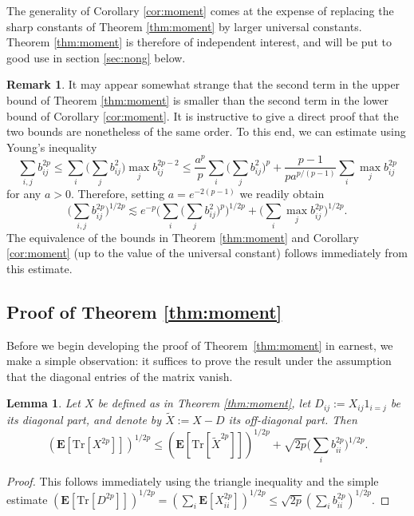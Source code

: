 \documentclass[10pt,reqno]{amsart}
\newtheorem{lem}[thm]{Lemma}
\theoremstyle{definition}
\newtheorem{rem}[thm]{Remark}
\numberwithin{equation}{section}
\numberwithin{figure}{section}
\numberwithin{table}{section}
\begin{document}
The generality of Corollary \ref{cor:moment} comes at the expense of 
replacing the sharp constants of Theorem \ref{thm:moment} by larger 
universal constants. Theorem \ref{thm:moment} is therefore of independent 
interest, and will be put to good use in section \ref{sec:nong} below.


\begin{rem}
\label{rem:strange}
It may appear somewhat strange that the second term in the upper bound of 
Theorem \ref{thm:moment} is smaller than the second term in the lower 
bound of Corollary \ref{cor:moment}. It is instructive to give a direct 
proof that the two bounds are nonetheless of the same order. To this end, 
we can estimate using Young's inequality
$$
	\sum_{i,j}b_{ij}^{2p} \le
	\sum_i \Bigg(\sum_j b_{ij}^2\Bigg)
	\max_j b_{ij}^{2p-2} \le
	\frac{a^p}{p}\sum_i\Bigg(\sum_j b_{ij}^2\Bigg)^p
	+
	\frac{p-1}{pa^{p/(p-1)}}
	\sum_i \max_j b_{ij}^{2p}
$$
for any $a>0$. Therefore, setting $a=e^{-2(p-1)}$ we readily obtain
$$
	\Bigg(\sum_{i,j}b_{ij}^{2p}\Bigg)^{1/2p} \lesssim
	e^{-p}
	\Bigg(\sum_i\Bigg(\sum_j b_{ij}^2\Bigg)^p\Bigg)^{1/2p}
	+
	\Bigg(
	\sum_i \max_j b_{ij}^{2p}
	\Bigg)^{1/2p}.
$$
The equivalence of the bounds in Theorem \ref{thm:moment} and
Corollary \ref{cor:moment} (up to the value of the universal constant)
follows immediately from this estimate.
\end{rem}



\subsection{Proof of Theorem \ref{thm:moment}}

Before we begin developing the proof of Theorem~\ref{thm:moment} in 
earnest, we make a simple observation: it suffices to prove the result
under the assumption that the diagonal entries of the matrix vanish.

\begin{lem}
\label{lem:nodiag}
Let $X$ be defined as in Theorem \ref{thm:moment}, let
$D_{ij}:=X_{ij}1_{i=j}$ be its diagonal part, and denote by
$\tilde X:=X-D$ its off-diagonal part. Then
$$
	(\mathbf{E}[\mathrm{Tr}[X^{2p}]])^{1/2p} \le
	(\mathbf{E}[\mathrm{Tr}[\tilde X^{2p}]])^{1/2p} +
	\sqrt{2p} \Bigg(\sum_i b_{ii}^{2p}\Bigg)^{1/2p}.
$$
\end{lem}

\begin{proof}
This follows immediately using the triangle inequality and the simple 
estimate $(\mathbf{E}[\mathrm{Tr}[D^{2p}]])^{1/2p}=
(\sum_i \mathbf{E}[X_{ii}^{2p}])^{1/2p} \le
\sqrt{2p} (\sum_i b_{ii}^{2p})^{1/2p}$.
\end{proof}
\end{document}
